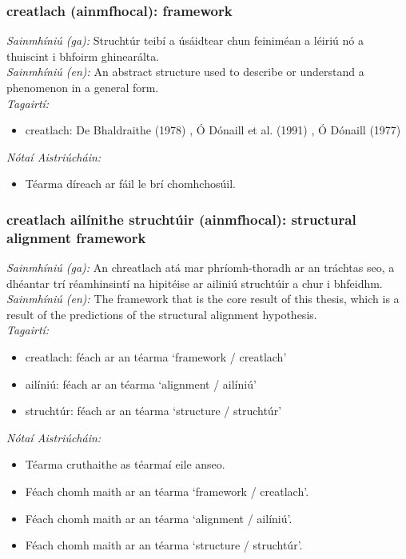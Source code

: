 \subsubsection*{creatlach (ainmfhocal): framework}
 \noindent \textit{Sainmhíniú (ga):} Struchtúr teibí a úsáidtear chun feiniméan a léiriú nó a thuiscint i bhfoirm ghinearálta.
\\
 \noindent \textit{Sainmhíniú (en):} An abstract structure used to describe or understand a phenomenon in a general form.
\\
 \noindent \textit{Tagairtí:}
\begin{itemize}
	\item creatlach: De Bhaldraithe (1978) \cite{de-bhaldraithe}, Ó Dónaill et al. (1991) \cite{focloir-beag}, Ó Dónaill (1977) \cite{odonaill}
\end{itemize}

 \noindent \textit{Nótaí Aistriúcháin:}
\begin{itemize}
	\item Téarma díreach ar fáil le brí chomhchosúil.
\end{itemize}


\subsubsection*{creatlach ailínithe struchtúir (ainmfhocal): structural alignment framework}
 \noindent \textit{Sainmhíniú (ga):} An chreatlach atá mar phríomh-thoradh ar an tráchtas seo, a dhéantar trí réamhinsintí na hipitéise ar ailiniú struchtúir a chur i bhfeidhm.
\\
 \noindent \textit{Sainmhíniú (en):} The framework that is the core result of this thesis, which is a result of the predictions of the structural alignment hypothesis.
\\
 \noindent \textit{Tagairtí:}
\begin{itemize}
	\item creatlach: féach ar an téarma `framework / creatlach'
	\item ailíniú: féach ar an téarma `alignment / ailíniú'
	\item struchtúr: féach ar an téarma `structure / struchtúr'
\end{itemize}

 \noindent \textit{Nótaí Aistriúcháin:}
\begin{itemize}
	\item Téarma cruthaithe as téarmaí eile anseo.
	\item Féach chomh maith ar an téarma `framework / creatlach'.
	\item Féach chomh maith ar an téarma `alignment / ailíniú'.
	\item Féach chomh maith ar an téarma `structure / struchtúr'.
\end{itemize}


